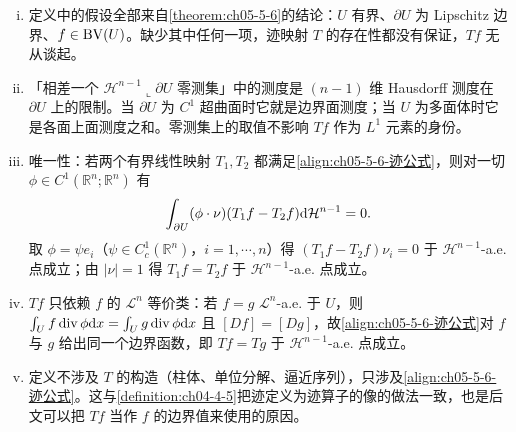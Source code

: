 \documentclass[../../main.tex]{subfiles}%
\begin{document}
\begin{remark}\label{remark:ch05-def-5-3-条件}
\begin{enumerate}[(i)]
\item 定义中的假设全部来自\cref{theorem:ch05-5-6}的结论：$U$ 有界、$\partial U$ 为 Lipschitz 边界、$f\in\mathrm{BV}(U)$。缺少其中任何一项，迹映射 $T$ 的存在性都没有保证，$Tf$ 无从谈起。%
\item 「相差一个 $\mathcal{H}^{n-1}\llcorner\partial U$ 零测集」中的测度是 $(n-1)$ 维 Hausdorff 测度在 $\partial U$ 上的限制。当 $\partial U$ 为 $C^1$ 超曲面时它就是边界面测度；当 $U$ 为多面体时它是各面上面测度之和。零测集上的取值不影响 $Tf$ 作为 $L^1$ 元素的身份。
\item 唯一性：若两个有界线性映射 $T_1,T_2$ 都满足\eqref{align:ch05-5-6-迹公式}，则对一切 $\phi\in C^1(\mathbb{R}^n;\mathbb{R}^n)$ 有
\begin{align*}
\int_{\partial U}(\phi\cdot\nu)(T_1f-T_2f)\mathrm{d}\mathcal{H}^{n-1}=0.
\end{align*}
取 $\phi=\psi e_i$（$\psi\in C_c^1(\mathbb{R}^n)$，$i=1,\cdots,n$）得 $(T_1f-T_2f)\nu_i=0$ 于 $\mathcal{H}^{n-1}$-a.e. 点成立；由 $\lvert\nu\rvert=1$ 得 $T_1f=T_2f$ 于 $\mathcal{H}^{n-1}$-a.e. 点成立。
\item $Tf$ 只依赖 $f$ 的 $\mathcal{L}^n$ 等价类：若 $f=g$ $\mathcal{L}^n$-a.e. 于 $U$，则 $\int_U f\operatorname{div}\phi\mathrm{d} x=\int_U g\operatorname{div}\phi\mathrm{d} x$ 且 $[Df]=[Dg]$，故\eqref{align:ch05-5-6-迹公式}对 $f$ 与 $g$ 给出同一个边界函数，即 $Tf=Tg$ 于 $\mathcal{H}^{n-1}$-a.e. 点成立。
\item 定义不涉及 $T$ 的构造（柱体、单位分解、逼近序列），只涉及\eqref{align:ch05-5-6-迹公式}。这与\cref{definition:ch04-4-5}把迹定义为迹算子的像的做法一致，也是后文可以把 $Tf$ 当作 $f$ 的边界值来使用的原因。%
\end{enumerate}
\end{remark}
\end{document}
